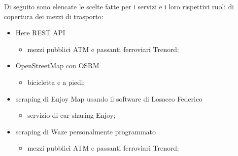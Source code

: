 Di seguito sono elencate le scelte fatte per i servizi e i loro rispettivi ruoli di copertura dei mezzi di trasporto:

\begin{itemize}
	\item Here REST API
	\begin{itemize}
		\item mezzi pubblici ATM e passanti ferroviari Trenord;
	\end{itemize}

	\item OpenStreetMap con OSRM
	\begin{itemize}
		\item bicicletta e a piedi;
	\end{itemize}

	\item scraping di Enjoy Map usando il software di Losacco Federico \cite{trentini2017sampling}
	\begin{itemize}
		\item servizio di car sharing Enjoy;
	\end{itemize}

	\item scraping di Waze personalmente programmato
	\begin{itemize}
		\item mezzi pubblici ATM e passanti ferroviari Trenord;
	\end{itemize}
\end{itemize}

